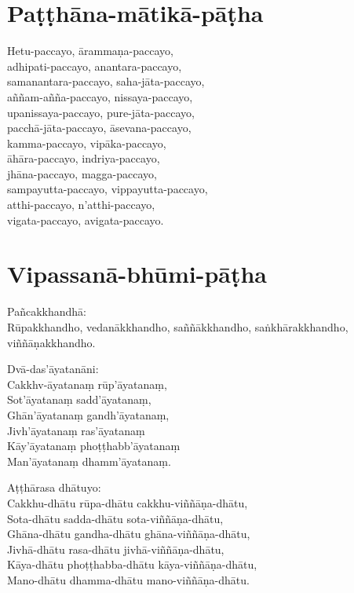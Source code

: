 

\section{Paṭṭhāna-mātikā-pāṭha}


Hetu-paccayo, ārammaṇa-paccayo,\\
adhipati-paccayo, anantara-paccayo,\\
samanantara-paccayo, saha-jāta-paccayo,\\
aññam-añña-paccayo, nissaya-paccayo,\\
upanissaya-paccayo, pure-jāta-paccayo,\\
pacchā-jāta-paccayo, āsevana-paccayo,\\
kamma-paccayo, vipāka-paccayo,\\
āhāra-paccayo, indriya-paccayo,\\
jhāna-paccayo, magga-paccayo,\\
sampayutta-paccayo, vippayutta-paccayo,\\
atthi-paccayo, n'atthi-paccayo,\\
vigata-paccayo, avigata-paccayo.


\section{Vipassanā-bhūmi-pāṭha}


Pañcakkhandhā:\\
Rūpakkhandho, vedanākkhandho, saññākkhandho, saṅkhārakkhandho, viññāṇakkhandho.

Dvā-das'āyatanāni:\\
Cakkhv-āyatanaṃ rūp'āyatanaṃ,\\
Sot'āyatanaṃ sadd'āyatanaṃ,\\
Ghān'āyatanaṃ gandh'āyatanaṃ,\\
Jivh'āyatanaṃ ras'āyatanaṃ\\
Kāy'āyatanaṃ phoṭṭhabb'āyatanaṃ\\
Man'āyatanaṃ dhamm'āyatanaṃ.

Aṭṭhārasa dhātuyo:\\
Cakkhu-dhātu rūpa-dhātu cakkhu-viññāṇa-dhātu,\\
Sota-dhātu sadda-dhātu sota-viññāṇa-dhātu,\\
Ghāna-dhātu gandha-dhātu ghāna-viññāṇa-dhātu,\\
Jivhā-dhātu rasa-dhātu jivhā-viññāṇa-dhātu,\\
Kāya-dhātu phoṭṭhabba-dhātu kāya-viññāṇa-dhātu,\\
Mano-dhātu dhamma-dhātu mano-viññāṇa-dhātu.

